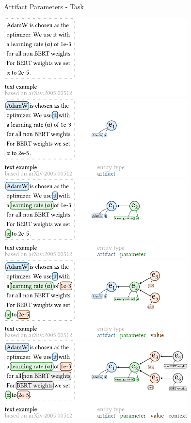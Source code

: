 \documentclass[en,16:9,smallfoot]{sdqbeamer}
\begin{document}
   \begin{frame}{Artifact Parameters - Task}
       \begin{overprint}
            \centering\includegraphics[width=0.75\textwidth]{imgs/schema_visual_praes_4}
            \centering\includegraphics[width=0.75\textwidth]{imgs/schema_visual_praes_3}
            \centering\includegraphics[width=0.75\textwidth]{imgs/schema_visual_praes_2}
            \centering\includegraphics[width=0.75\textwidth]{imgs/schema_visual_praes_1}
            \centering\includegraphics[width=0.75\textwidth]{imgs/schema_visual_praes_0}
       \end{overprint}
   \end{frame}
\end{document}
